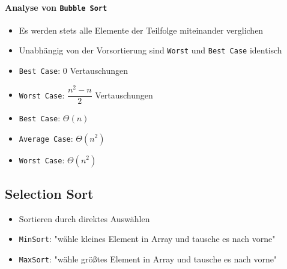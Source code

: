 \documentclass[
    ngerman,
    color=3b,
    dark_mode,
    summary,
    boxarc,
]{rubos-tuda-template}
\begin{document}
\paragraph{Analyse von \texttt{Bubble Sort}}
\begin{description}[leftmargin=5cm,itemsep=1em]
    \item [Anzahl der Vergleiche]
          \begin{itemize}
              \item Es werden stets alle Elemente der Teilfolge miteinander verglichen
              \item Unabhängig von der Vorsortierung sind \texttt{Worst} und \texttt{Best Case} identisch
          \end{itemize}

    \item [Anzahl der Vertauschungen]
          \begin{itemize}
              \item \texttt{Best Case}: 0 Vertauschungen
              \item \texttt{Worst Case}: $\dfrac{n^2-n}{2}$ Vertauschungen
          \end{itemize}

    \item [Komplexität]
          \begin{itemize}
              \item \texttt{Best Case}: $\Theta(n)$
              \item \texttt{Average Case}: $\Theta(n^2)$
              \item \texttt{Worst Case}: $\Theta(n^2)$
          \end{itemize}
\end{description}

\subsection{Selection Sort}\label{Selection sort}
\begin{idea}
    \begin{itemize}
        \item Sortieren durch direktes Auswählen
        \item \texttt{MinSort}: "wähle kleines Element in Array und tausche es nach vorne"
        \item \texttt{MaxSort}: "wähle grö\ss{}tes Element in Array und tausche es nach vorne"
    \end{itemize}
\end{idea}
\end{document}
